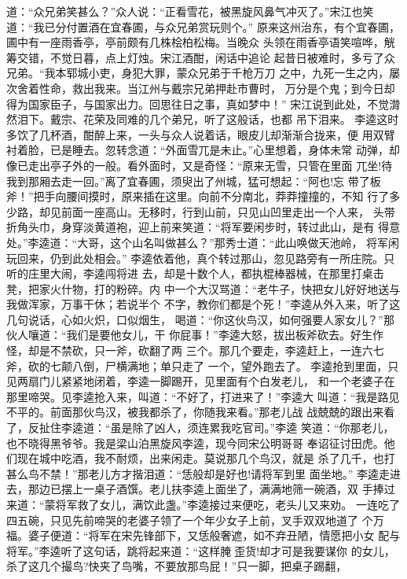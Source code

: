 道：“众兄弟笑甚么？”众人说：“正看雪花，被黑旋风鼻气冲灭了。”宋江也笑
道：“我已分付置酒在宜春圃，与众兄弟赏玩则个。”
原来这州治东，有个宜春圃，圃中有一座雨香亭，亭前颇有几株桧柏松梅。当晚众
头领在雨香亭语笑喧哗，觥筹交错，不觉日暮，点上灯烛。宋江酒酣，闲话中追论
起昔日被难时，多亏了众兄弟。“我本郓城小吏，身犯大罪，蒙众兄弟于千枪万刀
之中，九死一生之内，屡次舍着性命，救出我来。当江州与戴宗兄弟押赴市曹时，
万分是个鬼；到今日却得为国家臣子，与国家出力。回思往日之事，真如梦中！”
宋江说到此处，不觉潸然泪下。戴宗、花荣及同难的几个弟兄，听了这般话，也都
吊下泪来。
李逵这时多饮了几杯酒，酣醉上来，一头与众人说着话，眼皮儿却渐渐合拢来，便
用双臂衬着脸，已是睡去。忽转念道：“外面雪兀是未止。”心里想着，身体未常
动弹，却像已走出亭子外的一般。看外面时，又是奇怪：“原来无雪，只管在里面
兀坐!待我到那厢去走一回。”离了宜春圃，须臾出了州城，猛可想起：“阿也!忘
带了板斧！”把手向腰间摸时，原来插在这里。向前不分南北，莽莽撞撞的，不知
行了多少路，却见前面一座高山。无移时，行到山前，只见山凹里走出一个人来，
头带折角头巾，身穿淡黄道袍，迎上前来笑道：“将军要闲步时，转过此山，是有
得意处。”李逵道：“大哥，这个山名叫做甚么？”那秀士道：“此山唤做天池岭，
将军闲玩回来，仍到此处相会。”
李逵依着他，真个转过那山，忽见路旁有一所庄院。只听的庄里大闹，李逵闯将进
去，却是十数个人，都执棍棒器械，在那里打桌击凳，把家火什物，打的粉碎。内
中一个大汉骂道：“老牛子，快把女儿好好地送与我做浑家，万事干休；若说半个
不字，教你们都是个死！”李逵从外入来，听了这几句说话，心如火炽，口似烟生，
喝道：“你这伙鸟汉，如何强要人家女儿？”那伙人嚷道：“我们是要他女儿，干
你屁事！”李逵大怒，拔出板斧砍去。好生作怪，却是不禁砍，只一斧，砍翻了两
三个。那几个要走，李逵赶上，一连六七斧，砍的七颠八倒，尸横满地；单只走了
一个，望外跑去了。
李逵抢到里面，只见两扇门儿紧紧地闭着，李逵一脚踢开，见里面有个白发老儿，
和一个老婆子在那里啼哭。见李逵抢入来，叫道：“不好了，打进来了！”李逵大
叫道：“我是路见不平的。前面那伙鸟汉，被我都杀了，你随我来看。”那老儿战
战兢兢的跟出来看了，反扯住李逵道：“虽是除了凶人，须连累我吃官司。”李逵
笑道：“你那老儿，也不晓得黑爷爷。我是梁山泊黑旋风李逵，现今同宋公明哥哥
奉诏征讨田虎。他们现在城中吃酒，我不耐烦，出来闲走。莫说那几个鸟汉，就是
杀了几千，也打甚么鸟不禁！”那老儿方才揩泪道：“恁般却是好也!请将军到里
面坐地。”
李逵走进去，那边已摆上一桌子酒馔。老儿扶李逵上面坐了，满满地筛一碗酒，双
手捧过来道：“蒙将军救了女儿，满饮此盏。”李逵接过来便吃，老头儿又来劝。
一连吃了四五碗，只见先前啼哭的老婆子领了一个年少女子上前，叉手双双地道了
个万福。婆子便道：“将军在宋先锋部下，又恁般奢遮，如不弃丑陋，情愿把小女
配与将军。”李逵听了这句话，跳将起来道：“这样腌歪货!却才可是我要谋你
的女儿，杀了这几个撮鸟?快夹了鸟嘴，不要放那鸟屁！”只一脚，把桌子踢翻，
